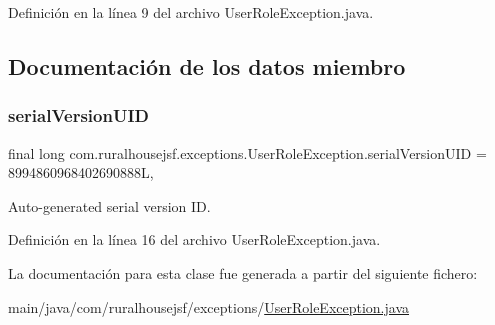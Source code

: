 Definición en la línea 9 del archivo User\+Role\+Exception.\+java.



\subsection{Documentación de los datos miembro}
\mbox{\label{classcom_1_1ruralhousejsf_1_1exceptions_1_1_user_role_exception_a9894bada17e7192af3bfcdd028fd6c57}} 
\subsubsection{\texorpdfstring{serialVersionUID}{serialVersionUID}}
{\footnotesize\ttfamily final long com.\+ruralhousejsf.\+exceptions.\+User\+Role\+Exception.\+serial\+Version\+U\+ID = 8994860968402690888L\hspace{0.3cm}{\ttfamily [static]}, {\ttfamily [private]}}



Auto-\/generated serial version ID. 



Definición en la línea 16 del archivo User\+Role\+Exception.\+java.



La documentación para esta clase fue generada a partir del siguiente fichero\+:\begin{DoxyCompactItemize}
\item 
main/java/com/ruralhousejsf/exceptions/\mbox{\hyperlink{_user_role_exception_8java}{User\+Role\+Exception.\+java}}\end{DoxyCompactItemize}
